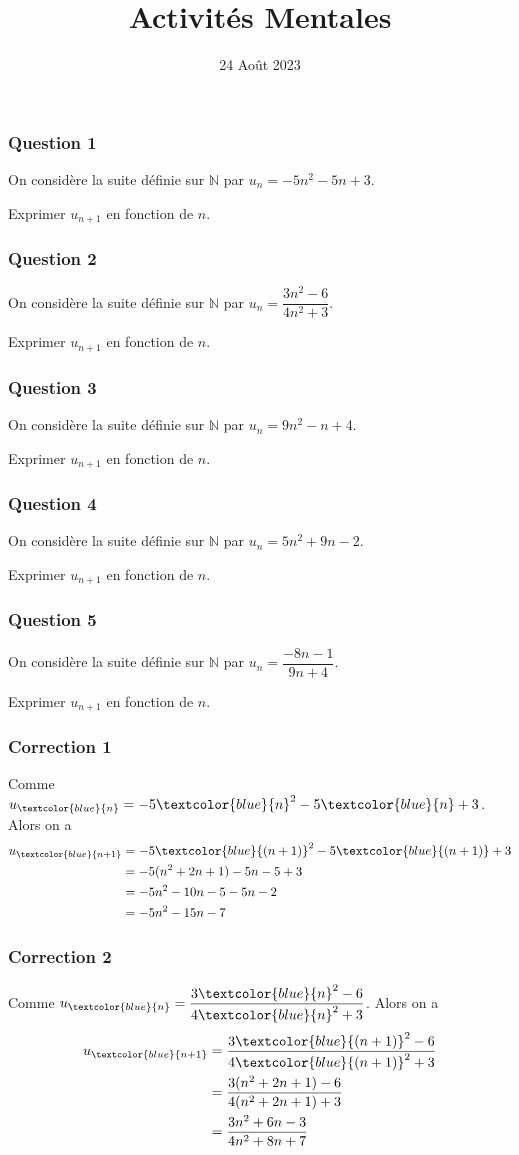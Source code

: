\documentclass[15pt, mathserif]{beamer}
\title{Activités Mentales}
\date{24 Août 2023}
\newcommand{\N}{\mathbb{N}}			%
\begin{document}
\begin{frame}
    \titlepage
\end{frame}

\begin{frame} 
	\frametitle{Question 1}
On considère la suite définie sur $\N$ par $u_n=-5n^2-5n+3$. 
 
 Exprimer $u_{n+1}$ en fonction de $n$.\end{frame}


\begin{frame} 
	\frametitle{Question 2}
On considère la suite définie sur $\N$ par $u_n=\dfrac{3n^2-6}{4n^2+3}$. 
 
 Exprimer $u_{n+1}$ en fonction de $n$.\end{frame}


\begin{frame} 
	\frametitle{Question 3}
On considère la suite définie sur $\N$ par $u_n=9n^2-n+4$. 
 
 Exprimer $u_{n+1}$ en fonction de $n$.\end{frame}


\begin{frame} 
	\frametitle{Question 4}
On considère la suite définie sur $\N$ par $u_n=5n^2+9n-2$. 
 
 Exprimer $u_{n+1}$ en fonction de $n$.\end{frame}


\begin{frame} 
	\frametitle{Question 5}
On considère la suite définie sur $\N$ par $u_n=\dfrac{-8n-1}{9n+4}$. 
 
 Exprimer $u_{n+1}$ en fonction de $n$.\end{frame}


\begin{frame}
\vspace{-10mm}
	\frametitle{Correction 1}
Comme $u_{\textcolor{blue}{n}}=-5{\textcolor{blue}{n}}^2-5{\textcolor{blue}{n}}+3$. Alors on a \begin{align*} 
 u_{{\textcolor{blue}{n+1}}} &=-5{\textcolor{blue}{(n+1)}}^2-5{\textcolor{blue}{(n+1)}}+3 \\ 
 &= -5(n^2+2n+1)-5n-5+3 \\ 
 &= -5n^2 -10n -5-5n-2\\ 
 &= -5n^2 -15n -7
 \end{align*}\end{frame}


\begin{frame}
\vspace{-10mm}
	\frametitle{Correction 2}
Comme $u_{\textcolor{blue}{n}}=\dfrac{3\textcolor{blue}{n}^2-6}{4\textcolor{blue}{n}^2+3}$. Alors on a \begin{align*} 
 u_{\textcolor{blue}{n+1}} &=\dfrac{3\textcolor{blue}{(n+1)}^2-6}{4\textcolor{blue}{(n+1)}^2+3} \\ 
 &= \dfrac{3(n^2+2n+1)-6}{4(n^2+2n+1)+3} \\ 
 &= \dfrac{3n^2+6n-3}{4n^2+8n+7}
 \end{align*}\end{frame}
\end{document}
